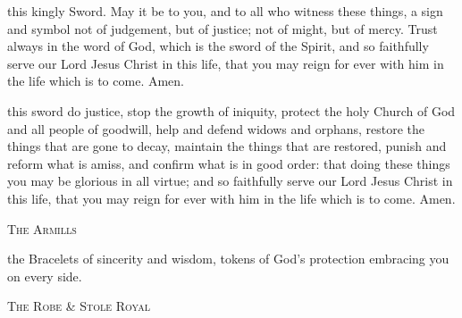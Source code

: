 {


 this kingly Sword.
May it be to you, and to all who witness these things,
a sign and symbol not of judgement, but of justice;
not of might, but of mercy.
Trust always in the word of God,
which is the sword of the Spirit,
and so faithfully serve our Lord Jesus Christ in this life,
that you may reign for ever with him
in the life which is to come. Amen.




\vfill 



 this sword do justice, stop the growth of iniquity, protect the holy
Church of God and all people of goodwill, help and defend widows and
orphans, restore the things that are gone to decay, maintain the things that
are restored, punish and reform what is amiss, and confirm what is in good
order: that doing these things you may be glorious in all virtue; and so
faithfully serve our Lord Jesus Christ in this life, that you may reign for ever
with him in the life which is to come. Amen.

\clearpage




\vfill 
\begin{center}\scshape\color{qred}The Armills\end{center}






 the Bracelets of sincerity and wisdom, tokens of God’s protection
embracing you on every side.


\vfill
\begin{center}\color{qred}\scshape The Robe \& Stole Royal\end{center}

}
